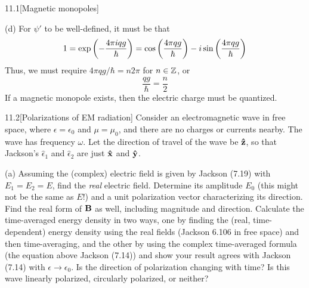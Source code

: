 \documentclass[12pt]{article}
\begin{document}
\begin{problem}{11.1}[Magnetic monopoles]
\begin{solution}
(d) For $\psi'$ to be well-defined, it must be that
\begin{equation}
    1=\exp\qty(-\frac{4\pi iqg}{\hbar})=\cos\qty(\frac{4\pi
    qg}{\hbar})-i\sin\qty(\frac{4\pi qg}{\hbar})
\end{equation}
Thus, we must require $4\pi qg/\hbar=n2\pi$ for $n\in\mathbb{Z}$, or
\begin{equation}
    \frac{qg}{\hbar}=\frac{n}{2} 
\end{equation}
If a magnetic monopole exists, then the electric charge must be quantized.
\end{solution}
\end{problem}
\begin{problem}{11.2}[Polarizations of EM radiation]
Consider an electromagnetic wave in free space, where $\epsilon=\epsilon_0$ and
$\mu=\mu_0$, and there are no charges or currents nearby. The wave has frequency
$\omega$. Let the direction of travel of the wave be $\vb{\hat{z}}$, so that Jackson's
$\hat\epsilon_1$ and $\hat\epsilon_2$ are just $\vb{\hat{x}}$ and $\vb{\hat{y}}$.

(a) Assuming the (complex) electric field is given by Jackson (7.19) with
$E_1=E_2=E$, find the \textit{real} electric field. Determine its amplitude
$E_0$ (this might not be the same as $E$!) and a unit polarization vector
characterizing its direction. Find the real form of $\vb{B}$ as well, including
magnitude and direction. Calculate the time-averaged energy density in two ways,
one by finding the (real, time-dependent) energy density using the real fields
(Jackson 6.106 in free space) and then time-averaging, and the other by using
the complex time-averaged formula (the equation above Jackson (7.14)) and show
your result agrees with Jackson (7.14) with $\epsilon\to\epsilon_0$. Is the
direction of polarization changing with time? Is this wave linearly polarized,
circularly polarized, or neither?


\end{problem}
\end{document}
